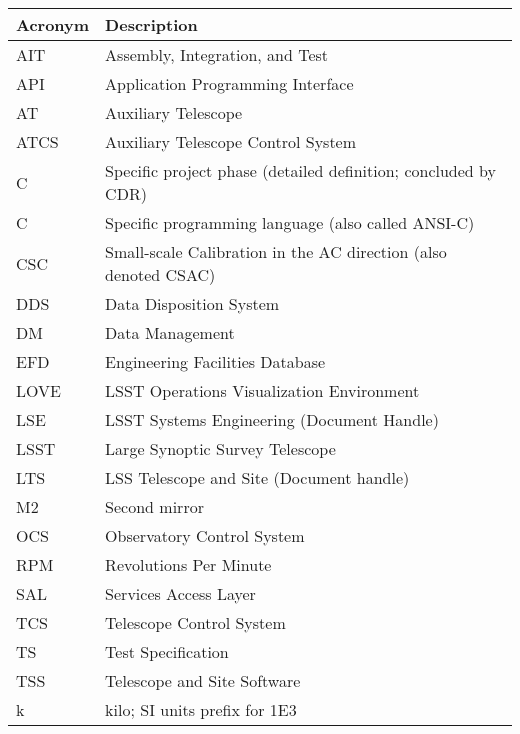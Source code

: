 \addtocounter{table}{-1}
\begin{longtable}{|l|p{}|}\hline
\textbf{Acronym} & \textbf{Description}  \\\hline

AIT & Assembly, Integration, and Test \\\hline
API & Application Programming Interface \\\hline
AT & Auxiliary Telescope \\\hline
ATCS & Auxiliary Telescope Control System \\\hline
C & Specific project phase (detailed definition; concluded by CDR) \\\hline
C & Specific programming language (also called ANSI-C) \\\hline
CSC & Small-scale Calibration in the AC direction (also denoted CSAC) \\\hline
DDS & Data Disposition System \\\hline
DM & Data Management \\\hline
EFD & Engineering Facilities Database \\\hline
LOVE & LSST Operations Visualization Environment \\\hline
LSE & LSST Systems Engineering (Document Handle) \\\hline
LSST & Large Synoptic Survey Telescope \\\hline
LTS & LSS Telescope and Site (Document handle) \\\hline
M2 & Second mirror \\\hline
OCS & Observatory Control System \\\hline
RPM & Revolutions Per Minute \\\hline
SAL & Services Access Layer \\\hline
TCS & Telescope Control System \\\hline
TS & Test Specification \\\hline
TSS & Telescope and Site Software \\\hline
k & kilo; SI units prefix for 1E3 \\\hline
\end{longtable}
